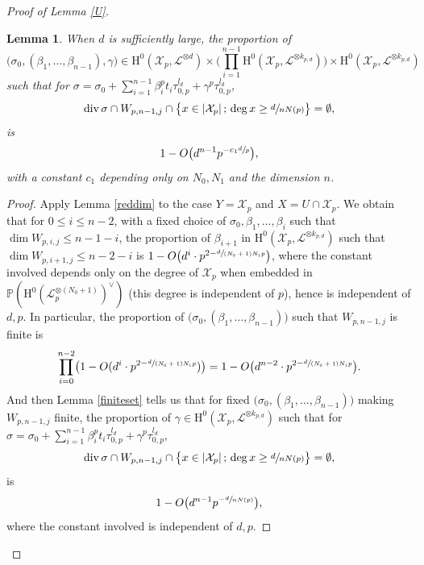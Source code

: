 \documentclass[11pt]{article}
\numberwithin{equation}{section}
\newcommand{\sep}{\,;\,}
\theoremstyle{plain}
\newtheorem{lem}[thm]{Lemma}
\theoremstyle{definition}
\newcommand{\ho}{\mathrm{H}}
\newcommand{\X}{\mathcal{X}}
\newcommand{\li}{\mathcal{L}}
\newcommand{\pr}{\mathbb{P}}
\begin{document}
\begin{proof}[Proof of Lemma \ref{U}]
\begin{lem}\label{5.8}
When $d$ is sufficiently large, the proportion of
\[
\big(\sigma_0, (\beta_1,\dots, \beta_{n-1}), \gamma\big) \in \ho^0(\X_p,\mathcal{L}^{\otimes d})\times \biggl(\prod_{i=1}^{n-1} \ho^0(\X_p,\mathcal{L}^{\otimes k_{p,d}}) \biggr) \times \ho^0(\X_p, \mathcal{L}^{\otimes k_{p,d}})
\]
such that for $\sigma=\sigma_{0}+\sum_{i=1}^{n-1} \beta_i^pt_i\tau_{0,p}^{l_d}+\gamma^p\tau_{0,p}^{l_d}$,
\[
\div \sigma\cap W_{p,n-1,j}\cap \bigl\{ x\in |\X_p|\sep \deg x\geq\sfrac{d}{nN(p)} \bigr\}=\emptyset,
\]
is
\[
1-O\bigl(d^{n-1}p^{-c_1\sfrac{d}{p}} \bigr),
\]
with a constant $c_1$ depending only on $N_0,N_1$ and the dimension $n$.
\end{lem}
\begin{proof}[Proof]
Apply Lemma \ref{reddim} to the case $Y=\X_p$ and $X=U\cap \X_p$. We obtain that for $0\leq i\leq n-2$, with a fixed choice of $\sigma_0,\beta_1,\dots, \beta_i$ such that $\dim W_{p,i,j}\leq n-1-i$, the proportion of $\beta_{i+1}$ in $\ho^0(\X_p,\mathcal{L}^{\otimes k_{p,d}})$ such that $\dim W_{p,i+1,j} \leq n-2-i$ is $1-O\big(d^i\cdot p^{2-\sfrac{d}{(N_0+1)N_1p}}\big)$, where the constant involved depends only on the degree of $\X_p$ when embedded in $\pr(\ho^0(\li_p^{\otimes(N_0+1)})^{\vee})$ (this degree is independent of $p$), hence is independent of $d,p$.
In particular, the proportion of $\big(\sigma_0,(\beta_1,\dots, \beta_{n-1})\big)$ such that $W_{p,n-1,j}$ is finite is
\[
\prod_{i=0}^{n-2}\bigl(1-O(d^i\cdot p^{2-\sfrac{d}{(N_0+1)N_1p}}) \bigr)=1-O\bigl(d^{n-2}\cdot p^{2-\sfrac{d}{(N_0+1)N_1p}}\bigr).
\]
And then Lemma \ref{finiteset} tells us that for fixed $\big(\sigma_0,(\beta_1,\dots, \beta_{n-1})\big)$ making $W_{p,n-1,j}$ finite, the proportion of $\gamma\in \ho^0(\X_p,\mathcal{L}^{\otimes k_{p,d}})$ such that for $\sigma=\sigma_{0}+\sum_{i=1}^{n-1} \beta_i^pt_i\tau_{0,p}^{l_d}+\gamma^p\tau_{0,p}^{l_d}$,
\[
\div \sigma\cap W_{p,n-1,j}\cap \bigl\{ x\in |\X_p|\sep \deg x\geq\sfrac{d}{nN(p)} \bigr\}=\emptyset,
\]
is
\[
1-O\bigl(d^{n-1}p^{-\sfrac{d}{nN(p)}}\bigr),
\]
where the constant involved is independent of $d,p$.


\end{proof}
\end{proof}
\end{document}
